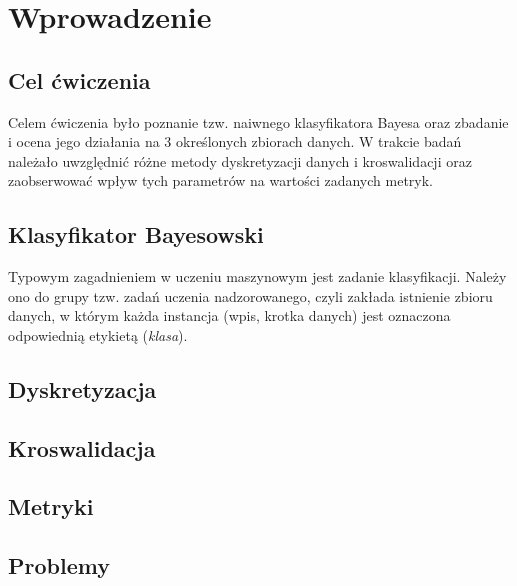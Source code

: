 \section{Wprowadzenie}
    \subsection{Cel ćwiczenia}
        Celem ćwiczenia było poznanie tzw. naiwnego klasyfikatora Bayesa oraz
        zbadanie i ocena jego działania na 3 określonych zbiorach danych. W trakcie
        badań należało uwzględnić różne metody dyskretyzacji danych i kroswalidacji
        oraz zaobserwować wpływ tych parametrów na wartości zadanych metryk.

    \subsection{Klasyfikator Bayesowski}
        Typowym zagadnieniem w uczeniu maszynowym jest zadanie klasyfikacji.
        Należy ono do grupy tzw. zadań uczenia nadzorowanego, czyli zakłada istnienie
        zbioru danych, w którym każda instancja (wpis, krotka danych) jest oznaczona
        odpowiednią etykietą (\textit{klasa}).

    \subsection{Dyskretyzacja}
    \subsection{Kroswalidacja}
    \subsection{Metryki}
    \subsection{Problemy}